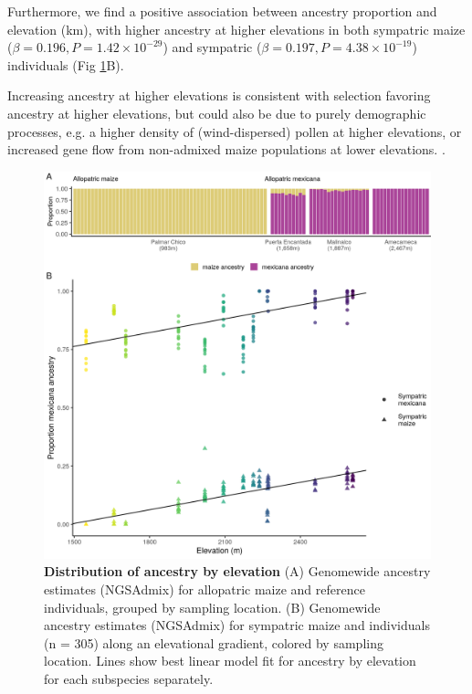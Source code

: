 Furthermore, we find a positive association between ancestry proportion and elevation (km), with higher \mexicana ancestry at higher elevations in both sympatric maize ($\beta=0.196, P = 1.42 \times 10^{-29}$) and sympatric \mexicana ($\beta=0.197, P = 4.38 \times 10^{-19}$) individuals (Fig \ref{global_anc_multi}B).

Increasing \mexicana ancestry at higher elevations is consistent with selection favoring \mexicana ancestry at higher elevations, but could also be due to purely demographic processes, e.g. a higher density of (wind-dispersed) \mexicana pollen at higher elevations, or increased gene flow from non-admixed maize populations at lower elevations. .

\begin{figure}[ht]
\includegraphics[width=\textwidth]{chapter2/figures/global_anc_multi.png}
\caption{\color{Gray} \textbf{Distribution of \mexicana ancestry by elevation} (A) Genomewide ancestry estimates (NGSAdmix) for allopatric maize and \mexicana reference individuals, grouped by sampling location. (B) Genomewide \mexicana ancestry estimates (NGSAdmix) for sympatric maize and \mexicana individuals (n = 305) along an elevational gradient, colored by sampling location. Lines show best linear model fit for \mexicana ancestry by elevation for each subspecies separately.}
\label{global_anc_multi}
\end{figure}


